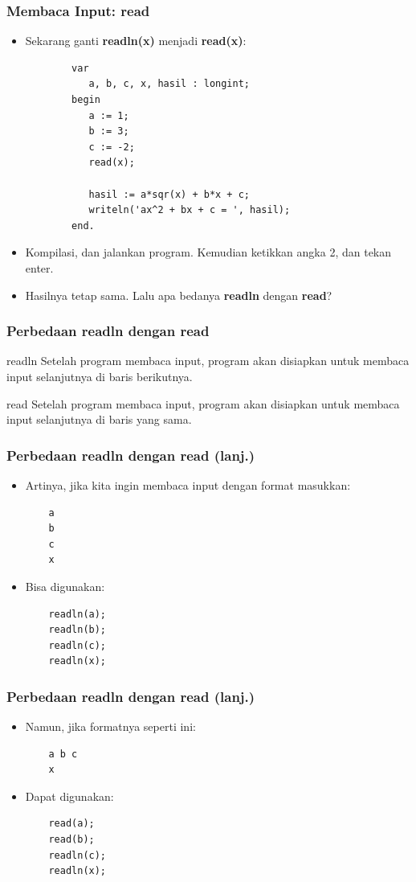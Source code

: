 \documentclass{beamer}
\begin{document}
\begin{frame}[fragile]
\frametitle{Membaca Input: read}
\begin{itemize}
	\item Sekarang ganti \textbf{readln(x)} menjadi \textbf{read(x)}:
	\begin{lstlisting}
		var
		   a, b, c, x, hasil : longint;
		begin
		   a := 1;
		   b := 3;
		   c := -2;
		   read(x);
		
		   hasil := a*sqr(x) + b*x + c;
		   writeln('ax^2 + bx + c = ', hasil);
		end.
	\end{lstlisting}
	\item Kompilasi, dan jalankan program. Kemudian ketikkan angka 2, dan tekan enter.
	\item Hasilnya tetap sama. Lalu apa bedanya \textbf{readln} dengan \textbf{read}?
\end{itemize}
\end{frame}

\begin{frame}[fragile]
\frametitle{Perbedaan readln dengan read}
\begin{block}{readln}
	Setelah program membaca input, program akan disiapkan untuk membaca input selanjutnya di \alert{baris berikutnya}.
\end{block}
\begin{block}{read}
	Setelah program membaca input, program akan disiapkan untuk membaca input selanjutnya di \alert{baris yang sama}.
\end{block}
\end{frame}

\begin{frame}[fragile]
\frametitle{Perbedaan readln dengan read (lanj.)}
\begin{itemize}
	\item Artinya, jika kita ingin membaca input dengan format masukkan:
	\begin{lstlisting}
	a
	b
	c
	x
	\end{lstlisting}
	\item Bisa digunakan:
	\begin{lstlisting}
	readln(a);
	readln(b);
	readln(c);
	readln(x);
	\end{lstlisting}
\end{itemize}
\end{frame}

\begin{frame}[fragile]
\frametitle{Perbedaan readln dengan read (lanj.)}
\begin{itemize}
	\item Namun, jika formatnya seperti ini:
	\begin{lstlisting}
	a b c
	x
	\end{lstlisting}
	\item Dapat digunakan:
	\begin{lstlisting}
	read(a);
	read(b);
	readln(c);
	readln(x);
	\end{lstlisting}
\end{itemize}
\end{frame}
\end{document}
